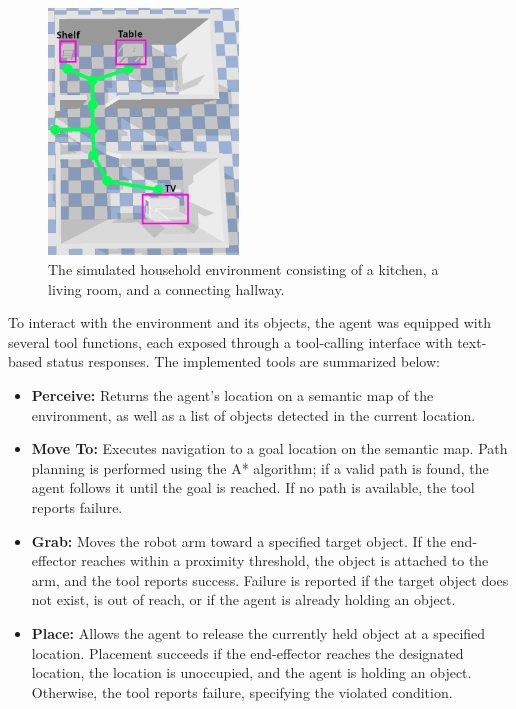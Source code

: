 \documentclass[../report.tex]{subfiles}
\begin{document}
\begin{figure}[h!]
	\centering
	\includegraphics[width=0.45\textwidth]{figures/environment.png}
	\caption{The simulated household environment consisting of a kitchen, a living room, and a connecting hallway.}
	\label{fig:environment}
\end{figure}

To interact with the environment and its objects, the agent was equipped with several tool functions, each exposed through a tool-calling interface with text-based status responses. The implemented tools are summarized below:
\begin{itemize}
	\item \textbf{Perceive:} Returns the agent’s location on a semantic map of the environment, as well as a list of objects detected in the current location.
	\item \textbf{Move To:} Executes navigation to a goal location on the semantic map. Path planning is performed using the A* algorithm; if a valid path is found, the agent follows it until the goal is reached. If no path is available, the tool reports failure.
	\item \textbf{Grab:} Moves the robot arm toward a specified target object. If the end-effector reaches within a proximity threshold, the object is attached to the arm, and the tool reports success. Failure is reported if the target object does not exist, is out of reach, or if the agent is already holding an object.
	\item \textbf{Place:} Allows the agent to release the currently held object at a specified location. Placement succeeds if the end-effector reaches the designated location, the location is unoccupied, and the agent is holding an object. Otherwise, the tool reports failure, specifying the violated condition.
\end{itemize}
\end{document}
